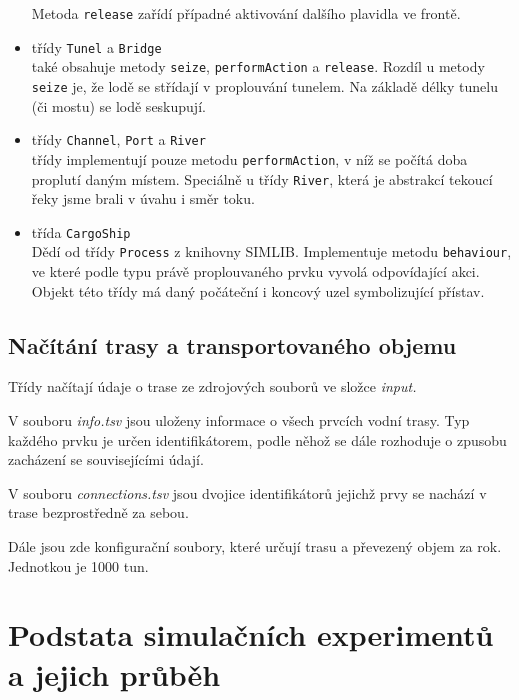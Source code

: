 \documentclass[11pt,a4paper]{article}
\begin{document}
\begin{itemize}
              Metoda \texttt{release} zařídí případné aktivování dalšího
              plavidla ve frontě.
        \item třídy \texttt{Tunel} a \texttt{Bridge} \\
              také obsahuje metody \texttt{seize}, \texttt{performAction} a
              \texttt{release}. Rozdíl u metody \texttt{seize} je, že lodě se
              střídají v proplouvání tunelem. Na základě délky tunelu
              (či mostu) se lodě seskupují.
        \item třídy \texttt{Channel}, \texttt{Port} a \texttt{River} \\
              třídy implementují pouze metodu \texttt{performAction}, v níž se
              počítá doba proplutí daným místem. Speciálně u třídy
              \texttt{River}, která je abstrakcí tekoucí řeky jsme brali v
              úvahu i směr toku.
        \item třída \texttt{CargoShip} \\
              Dědí od třídy \texttt{Process} z knihovny SIMLIB. Implementuje
              metodu \texttt{behaviour}, ve které podle typu právě
              proplouvaného prvku vyvolá odpovídající akci. Objekt této třídy
              má daný počáteční i
              koncový uzel symbolizující přístav.
      \end{itemize}

    \subsection{Načítání trasy a transportovaného objemu}

      Třídy načítají údaje o trase ze zdrojových souborů ve složce
      \textit{input.}

      V souboru \textit{info.tsv} jsou uloženy informace o všech 
      prvcích vodní trasy. Typ každého prvku je určen identifikátorem, podle
      něhož se dále rozhoduje o zpusobu zacházení se souvisejícími údají.

      V souboru \textit{connections.tsv} jsou dvojice identifikátorů jejichž
      prvy se nachází v trase bezprostředně za sebou.

      Dále jsou zde konfigurační soubory, které určují trasu a převezený objem
      za rok. Jednotkou je 1000 tun.

  \section{Podstata simulačních experimentů a jejich průběh}
\end{document}
